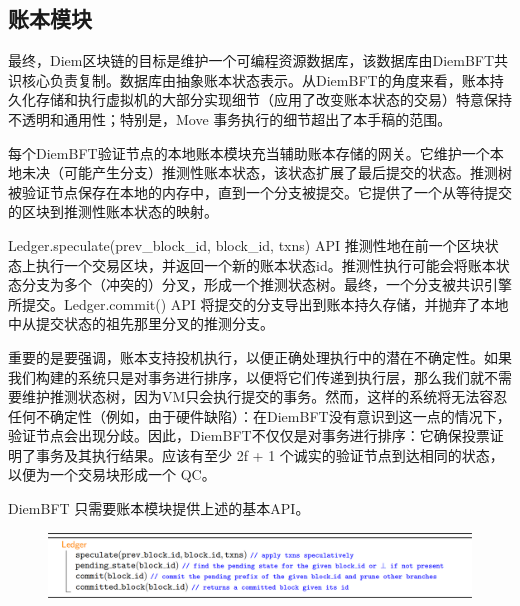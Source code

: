 
      

\subsection{账本模块}

最终，Diem区块链的目标是维护一个可编程资源数据库，该数据库由DiemBFT共识核心负责复制。数据库由抽象账本状态表示。从DiemBFT的角度来看，账本持久化存储和执行虚拟机的大部分实现细节（应用了改变账本状态的交易）特意保持不透明和通用性；特别是，Move 事务执行的细节超出了本手稿的范围。

每个DiemBFT验证节点的本地账本模块充当辅助账本存储的网关。它维护一个本地未决（可能产生分支）推测性账本状态，该状态扩展了最后提交的状态。推测树被验证节点保存在本地的内存中，直到一个分支被提交。它提供了一个从等待提交的区块到推测性账本状态的映射。

Ledger.speculate(prev\_block\_id, block\_id, txns) API 推测性地在前一个区块状态上执行一个交易区块，并返回一个新的账本状态id。推测性执行可能会将账本状态分支为多个（冲突的）分叉，形成一个推测状态树。最终，一个分支被共识引擎所提交。Ledger.commit() API 将提交的分支导出到账本持久存储，并抛弃了本地中从提交状态的祖先那里分叉的推测分支。

重要的是要强调，账本支持投机执行，以便正确处理执行中的潜在不确定性。如果我们构建的系统只是对事务进行排序，以便将它们传递到执行层，那么我们就不需要维护推测状态树，因为VM只会执行提交的事务。然而，这样的系统将无法容忍任何不确定性（例如，由于硬件缺陷）：在DiemBFT没有意识到这一点的情况下，验证节点会出现分歧。因此，DiemBFT不仅仅是对事务进行排序：它确保投票证明了事务及其执行结果。应该有至少 2f + 1 个诚实的验证节点到达相同的状态，以便为一个交易块形成一个 QC。

DiemBFT 只需要账本模块提供上述的基本API。

\begin{figure}[htbp]
    \centering
    \includegraphics[width=12cm]{figures/code2.png}
\end{figure}

